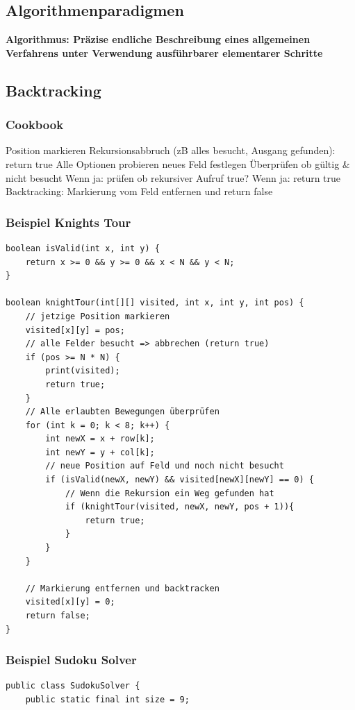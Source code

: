 \begin{multicols*}{4}
\section{Algorithmenparadigmen}
 \textbf{Algorithmus: Präzise endliche Beschreibung eines allgemeinen Verfahrens unter Verwendung
	ausführbarer elementarer Schritte}

	\subsection{Backtracking}
		\subsubsection{Cookbook}
			\renewcommand{\outlineii}{enumerate}
			\renewcommand{\outlineiii}{enumerate}
			\begin{outline}
				\1 Position markieren
				\1 Rekursionsabbruch (zB alles besucht, Ausgang gefunden): return true 
				\1 Alle Optionen probieren
					\2 neues Feld festlegen
					\2 Überprüfen ob gültig \& nicht besucht
						\3 Wenn ja: prüfen ob rekursiver Aufruf true? 
							\4 Wenn ja: return true
				\1 Backtracking: Markierung vom Feld entfernen und return false
			\end{outline}
			\renewcommand{\outlineii}{itemize}
			\renewcommand{\outlineiii}{itemize}
		
		\subsubsection{Beispiel Knights Tour}
			\begin{lstlisting}
boolean isValid(int x, int y) {
	return x >= 0 && y >= 0 && x < N && y < N;
}

boolean knightTour(int[][] visited, int x, int y, int pos) {
	// jetzige Position markieren
	visited[x][y] = pos;
	// alle Felder besucht => abbrechen (return true)
	if (pos >= N * N) {
		print(visited);
		return true;
	}
	// Alle erlaubten Bewegungen überprüfen
	for (int k = 0; k < 8; k++) {
		int newX = x + row[k];
		int newY = y + col[k];
		// neue Position auf Feld und noch nicht besucht
		if (isValid(newX, newY) && visited[newX][newY] == 0) {
			// Wenn die Rekursion ein Weg gefunden hat
			if (knightTour(visited, newX, newY, pos + 1)){
				return true;
			}
		}
	}
	
	// Markierung entfernen und backtracken
	visited[x][y] = 0;
	return false;
}
			\end{lstlisting}
		
		\subsubsection{Beispiel Sudoku Solver}
			\begin{lstlisting}
public class SudokuSolver { 
	public static final int size = 9; 
	

\end{lstlisting}
\end{multicols*}
